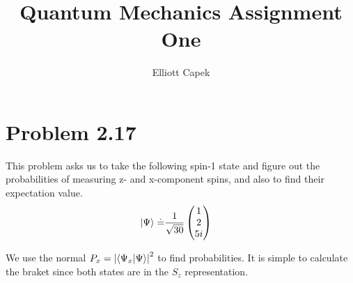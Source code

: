\documentclass[10pt]{article} %
\title{Quantum Mechanics Assignment One}
\author{Elliott Capek}
\begin{document}
\maketitle{}

\section{Problem 2.17}
This problem asks us to take the following spin-1 state and figure out the probabilities of
measuring z- and x-component spins, and also to find their expectation value.\\

\begin{align*}
  \ket{\Psi} \doteq &\frac{1}{\sqrt{30}}
  \begin{pmatrix}
    1\\
    2\\
    5i\\
  \end{pmatrix}
\end{align*}

We use the normal $P_x = \abs{\braket{\Psi_x}{\Psi}}^2$ to find probabilities. It is simple to
calculate the braket since both states are in the $S_z$ representation.
\end{document}
